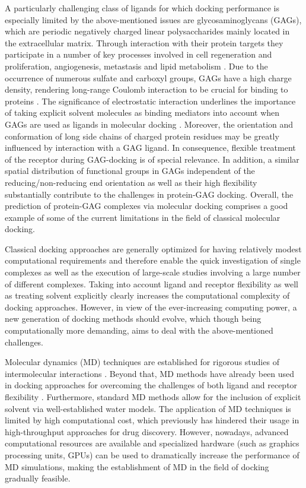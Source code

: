 A particularly challenging class of ligands for which docking
performance is especially limited by the above-mentioned issues are
glycosaminoglycans (GAGs), which are periodic negatively charged linear
polysaccharides mainly located in the extracellular matrix. Through interaction
with their protein targets they participate in a number of key processes
involved in cell regeneration and proliferation, angiogenesis, metastasis and
lipid metabolism \cite{hynes_extracellular_2009, macri_growth_2007,
barbero_chembiochem_2013}. Due to the occurrence of numerous sulfate and
carboxyl groups, GAGs have a high charge density, rendering long-range Coulomb
interaction to be crucial for binding to proteins
\cite{mulloy_specificity_2005}. The significance of electrostatic interaction
underlines the importance of taking explicit solvent molecules as binding
mediators into account when GAGs are used as ligands in molecular docking
\cite{samsonov_docking_2011}. Moreover, the orientation and conformation of long
side chains of charged protein residues may be greatly influenced by interaction
with a GAG ligand. In consequence, flexible treatment of the receptor during
GAG-docking is of special relevance. In addition, a similar spatial distribution
of functional groups in GAGs independent of the reducing/non-reducing end
orientation \cite{hp_binding_sites_mulloy_2006} as well as their high
flexibility \cite{bitomsky_docking_1999} substantially contribute to the
challenges in protein-GAG docking. Overall, the prediction of protein-GAG
complexes via molecular docking comprises a good example of some of the current
limitations in the field of classical molecular docking.

Classical docking approaches are generally optimized for having relatively
modest computational requirements and therefore enable the quick investigation
of single complexes as well as the execution of large-scale studies involving a
large number of different complexes. Taking into account ligand and receptor
flexibility as well as treating solvent explicitly clearly increases the
computational complexity of docking approaches. However, in view of the
ever-increasing computing power, a new generation of docking methods should
evolve, which though being computationally more demanding, aims to deal with the
above-mentioned challenges.

Molecular dynamics (MD) techniques are established for rigorous studies of
intermolecular interactions \cite{karplus_molecular_2005}. Beyond that, MD
methods have already been used in docking approaches for overcoming the
challenges of both ligand and receptor flexibility
\cite{chaudhuri_application_2012, antes_dynadock_2010}. Furthermore, standard MD
methods allow for the inclusion of explicit solvent via well-established water
models. The application of MD techniques is limited by high computational cost,
which previously has hindered their usage in high-throughput approaches for drug
discovery. However, nowadays, advanced computational resources are available and
specialized hardware (such as graphics processing units, GPUs) can be used to
dramatically increase the performance of MD simulations, making the
establishment of MD in the field of docking gradually feasible.


